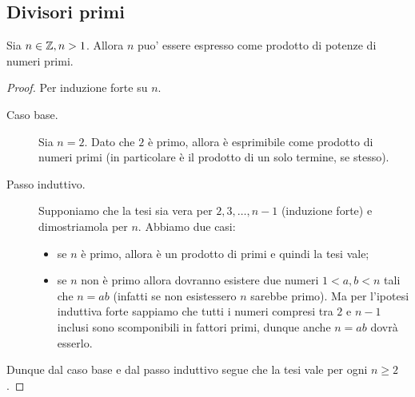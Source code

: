 \subsection{Divisori primi}
\begin{proposition} 
    \label{esistenza_scomposizione_primi}
    Sia $n \in \mathbb{Z}, n > 1$. Allora $n$ puo' essere espresso come prodotto di potenze di numeri primi.
\end{proposition}
\begin{proof}
    Per induzione forte su $n$.
    \begin{description}
        \item[Caso base.]
        Sia $n = 2$. Dato che $2$ è primo, allora è esprimibile come prodotto di numeri primi (in particolare è il prodotto di un solo termine, se stesso).
        \item[Passo induttivo.]
        Supponiamo che la tesi sia vera per $2, 3, \dots, n-1$ (induzione forte) e dimostriamola per $n$.
        Abbiamo due casi:
        \begin{itemize}
            \item se $n$ è primo, allora è un prodotto di primi e quindi la tesi vale;
            \item se $n$ non è primo allora dovranno esistere due numeri $1 < a, b < n$ tali che $n = ab$ (infatti se non esistessero $n$ sarebbe primo). Ma per l'ipotesi induttiva forte sappiamo che tutti i numeri compresi tra $2$ e $n-1$ inclusi sono scomponibili in fattori primi, dunque anche $n = ab$ dovrà esserlo.
        \end{itemize}
    \end{description}
    Dunque dal caso base e dal passo induttivo segue che la tesi vale per ogni $n \geq 2$.
\end{proof}

